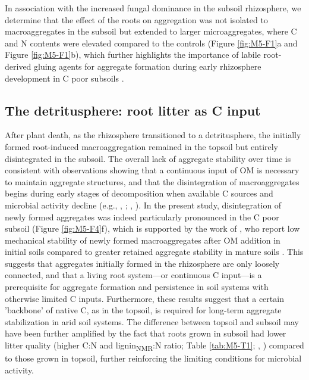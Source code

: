 In association with the increased fungal dominance in the subsoil rhizosphere, we determine that the effect of the roots on aggregation was not isolated to macroaggregates in the subsoil but extended to larger microaggregates, where C and N contents were elevated compared to the controls (Figure \ref{fig:M5-F1}a and Figure \ref{fig:M5-F1}b), which further highlights the importance of labile root-derived gluing agents for aggregate formation during early rhizosphere development in C poor subsoils \citep{Baumert2018}.

\subsection{The detritusphere: root litter as C input}

After plant death, as the rhizosphere transitioned to a detritusphere, the initially formed root-induced macroaggregation remained in the topsoil but entirely disintegrated in the subsoil. The overall lack of aggregate stability over time is consistent with observations showing that a continuous input of OM is necessary to maintain aggregate structures, and that the disintegration of macroaggregates begins during early stages of decomposition when available C sources and microbial activity decline (e.g., \citeauthor{Golchin1997}, \citeyear{Golchin1997}; \citeauthor{Helfrich2008}, \citeyear{Helfrich2008}). In the present study, disintegration of newly formed aggregates was indeed particularly pronounced in the C poor subsoil (Figure \ref{fig:M5-F4}f), which is supported by the work of \citet{Bucka2021}, who report low mechanical stability of newly formed macroaggregates after OM addition in initial soils compared to greater retained aggregate stability in mature soils \citep{Felde2020}. This suggests that aggregates initially formed in the rhizosphere are only loosely connected, and that a living root system---or continuous C input---is a prerequisite for aggregate formation and persistence in soil systems with otherwise limited C inputs. Furthermore, these results suggest that a certain 'backbone' of native C, as in the topsoil, is required for long-term aggregate stabilization in arid soil systems. The difference between topsoil and subsoil may have been further amplified by the fact that roots grown in subsoil had lower litter quality (higher C:N and lignin\textsubscript{NMR}:N ratio; Table \ref{tab:M5-T1}; \citeauthor{Walela2014}, \citeyear{Walela2014}) compared to those grown in topsoil, further reinforcing the limiting conditions for microbial activity.

